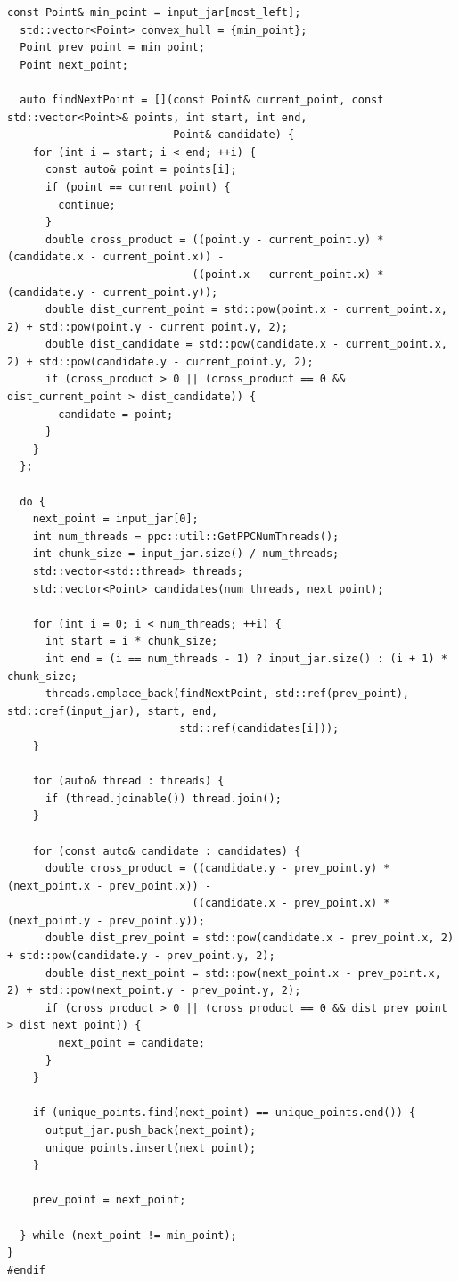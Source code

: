 \documentclass[12pt,a4paper]{article}
\begin{document}
\begin{lstlisting}[caption={STL-версия алгоритма}]
  const Point& min_point = input_jar[most_left];
  std::vector<Point> convex_hull = {min_point};
  Point prev_point = min_point;
  Point next_point;

  auto findNextPoint = [](const Point& current_point, const std::vector<Point>& points, int start, int end,
                          Point& candidate) {
    for (int i = start; i < end; ++i) {
      const auto& point = points[i];
      if (point == current_point) {
        continue;
      }
      double cross_product = ((point.y - current_point.y) * (candidate.x - current_point.x)) -
                             ((point.x - current_point.x) * (candidate.y - current_point.y));
      double dist_current_point = std::pow(point.x - current_point.x, 2) + std::pow(point.y - current_point.y, 2);
      double dist_candidate = std::pow(candidate.x - current_point.x, 2) + std::pow(candidate.y - current_point.y, 2);
      if (cross_product > 0 || (cross_product == 0 && dist_current_point > dist_candidate)) {
        candidate = point;
      }
    }
  };

  do {
    next_point = input_jar[0];
    int num_threads = ppc::util::GetPPCNumThreads();
    int chunk_size = input_jar.size() / num_threads;
    std::vector<std::thread> threads;
    std::vector<Point> candidates(num_threads, next_point);

    for (int i = 0; i < num_threads; ++i) {
      int start = i * chunk_size;
      int end = (i == num_threads - 1) ? input_jar.size() : (i + 1) * chunk_size;
      threads.emplace_back(findNextPoint, std::ref(prev_point), std::cref(input_jar), start, end,
                           std::ref(candidates[i]));
    }

    for (auto& thread : threads) {
      if (thread.joinable()) thread.join();
    }

    for (const auto& candidate : candidates) {
      double cross_product = ((candidate.y - prev_point.y) * (next_point.x - prev_point.x)) -
                             ((candidate.x - prev_point.x) * (next_point.y - prev_point.y));
      double dist_prev_point = std::pow(candidate.x - prev_point.x, 2) + std::pow(candidate.y - prev_point.y, 2);
      double dist_next_point = std::pow(next_point.x - prev_point.x, 2) + std::pow(next_point.y - prev_point.y, 2);
      if (cross_product > 0 || (cross_product == 0 && dist_prev_point > dist_next_point)) {
        next_point = candidate;
      }
    }

    if (unique_points.find(next_point) == unique_points.end()) {
      output_jar.push_back(next_point);
      unique_points.insert(next_point);
    }

    prev_point = next_point;

  } while (next_point != min_point);
}
#endif
\end{lstlisting}
\end{document}
